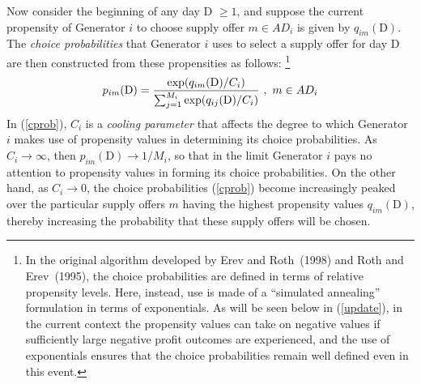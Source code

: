 \documentclass[12pt]{article}
\begin{document}
     Now consider the beginning of any day D $\ge 1$, and suppose the 
current propensity of Generator $i$ to choose supply offer $m \in AD_i$ is given by
$q_{im}(\mbox{D})$.  The {\it choice probabilities\/} that Generator $i$ uses to
select a supply offer for day D are then constructed from these propensities as follows:%
        \footnote{In the original algorithm developed by Erev and
Roth~(1998) and Roth and Erev~(1995), the choice probabilities
are defined in terms of relative propensity levels.  Here, instead, use is
made of a ``simulated annealing'' formulation in terms of exponentials.  As
will be seen below in (\ref{update}), in the current context the propensity
values can take on negative values if sufficiently large negative profit
outcomes are experienced, and the use of exponentials ensures that the choice
probabilities remain well defined even in this event.}
                 \begin{equation}
     p_{im}(\mbox{D}) = \frac{\exp(q_{im}(\mbox{D})/C_{i}) }
               { \sum_{j=1}^{M_i} \exp(q_{ij}(\mbox{D})/C_{i}) }~,~m \in AD_i  \label{cprob} \\
                   \end{equation}
In (\ref{cprob}), $C_{i}$ is a {\it cooling parameter\/} that affects the
degree to which Generator $i$ makes use of propensity values in determining
its choice probabilities.  As $C_{i} \rightarrow \infty$, then 
$p_{im}(\mbox{D}) \rightarrow 1/M_i$, so that in the limit Generator $i$ pays
no attention to propensity values in forming its choice probabilities.  On
the other hand, as $C_{i} \rightarrow 0$, the choice probabilities
(\ref{cprob}) become increasingly peaked over the particular supply offers
$m$ having the highest propensity values $q_{im}(\mbox{D})$, thereby increasing the probability
that these supply offers will be chosen.
\end{document}
